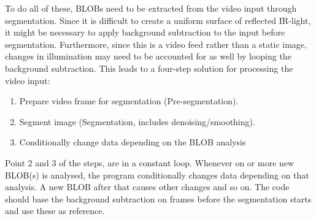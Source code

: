 To do all of these, BLOBs need to be extracted from the video input through segmentation. Since it is difficult to create a uniform surface of reflected IR-light, it might be necessary to apply background subtraction to the input before segmentation. Furthermore, since this is a video feed rather than a static image, changes in illumination may need to be accounted for as well by looping the background subtraction. This leads to a four-step solution for processing the video input:
\begin{enumerate}
\item Prepare video frame for segmentation (Pre-segmentation).
\item Segment image (Segmentation, includes denoising/smoothing).
\item Conditionally change data depending on the BLOB analysis
\end{enumerate}
Point 2 and 3 of the steps, are in a constant loop. Whenever on or more new BLOB(s) is analysed, the program conditionally changes data depending on that analysis. A new BLOB after that causes other changes and so on. The code should base the background subtraction on frames before the segmentation starts and use these as reference.

